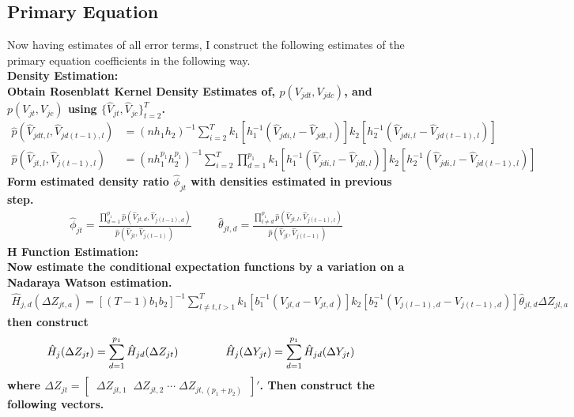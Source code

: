 \documentclass[10pt]{article}
\begin{document}
\subsection*{Primary Equation}
%
Now having estimates of all error terms, I construct the following estimates of the primary equation coefficients in the following way. \\
%
\noindent \bf Density Estimation: \rm  \\
%
Obtain Rosenblatt Kernel Density Estimates of, $p(V_{jdt},V_{jdc})$, and $p(V_{jt},V_{jc})$ using $\{\hat{V}_{jt}, \hat{V}_{jc}\}_{t=2}^T$.
\begin{align*}
 \hat{p}(\hat{V}_{jdt,l},\hat{V}_{jd(t-1),l})
&= (nh_1h_2)^{-1}\sum_{ i = 2 }^T k_1[h_1^{-1}(\hat{V}_{jdi,l} -\hat{V}_{jdt,l})]k_2[h_2^{-1}(\hat{V}_{jdi,l} -\hat{V}_{jd(t-1),l})]  \\
%
 \hat{p}(\hat{V}_{jt,l},\hat{V}_{j(t-1),l})
&= (nh_1^{p_1}h_2^{p_1})^{-1}\sum_{ i = 2 }^T \prod_{d=1}^{p_1} k_1[h_1^{-1}(\hat{V}_{jdi,l} -\hat{V}_{jdt,l})]k_2[h_2^{-1}(\hat{V}_{jdi,l} -\hat{V}_{jd(t-1),l})]
\end{align*}
 Form estimated density ratio $\hat{\phi}_{jt}$ with densities estimated in previous step.
\begin{align*}
\hat{\phi}_{jt} = \frac{ \prod_{d=1}^{p_1}\hat{p}(\hat{V}_{jt,d},\hat{V}_{j(t-1),d}) }{\hat{p}(\hat{V}_{jt},\hat{V}_{j(t-1)})}
%
\hspace{1cm}
%
\hat{\theta}_{jt,d} = \frac{ \prod_{l \neq d}^{p_1}\hat{p}(\hat{V}_{jt,l},\hat{V}_{j(t-1),l}) }{\hat{p}(\hat{V}_{jt},\hat{V}_{j(t-1)})}
\end{align*}
%
\noindent \bf H Function Estimation:  \rm  \\
%
Now estimate the conditional expectation functions by a variation on a Nadaraya Watson estimation.
\begin{align*}
 \hat{H}_{j,d}(\Delta Z_{jt,a}) = [(T-1)b_1b_2]^{-1} \sum_{l \neq t , l > 1}^T k_1[b_1^{-1}(V_{jl,d} - V_{jt,d})] k_2[b_2^{-1}(V_{j(l-1),d} - V_{j(t-1),d})] \hat{\theta}_{jl,d} \Delta Z_{jl,a}
 \end{align*}
then construct
    \begin{align*}
    \hat{H}_j(\Delta Z_{jt}) &= \sum_{d=1}^{p_1} \hat{H}_{jd}(\Delta Z_{jt})  \hspace{1.5cm}
%
\hat{H}_j(\Delta Y_{jt}) = \sum_{d=1}^{p_1} \hat{H}_{jd}(\Delta Y_{jt})
    \end{align*}
where $ \Delta Z_{jt}  = [ \; \; \Delta Z_{jt,1}    \;\;    \Delta Z_{jt,2}     \;   \cdots \; \Delta Z_{jt,(p_1+p_2)} \;\; ]'$. Then construct the following vectors.
\end{document}

